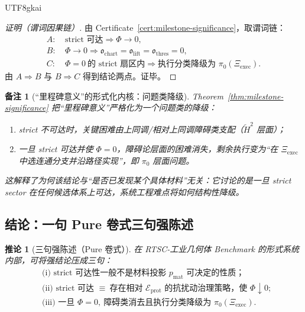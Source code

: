 \documentclass[12pt]{article}
\newtheorem{corollary}{推论}[section]
\newtheorem{remark}{备注}[section]
\newcommand{\RTSC}{\textsf{RTSC}}
\begin{document}
\begin{CJK*}{UTF8}{gkai}
\begin{proof}[证明（谓词因果链）]
由 Certificate~\ref{cert:milestone-significance}，取谓词链：
\[
\begin{aligned}
A:&\ \text{strict 可达}\Rightarrow \Phi\to 0,\\
B:&\ \Phi\to 0\Rightarrow \mathfrak{o}_{\mathrm{chart}}=\mathfrak{o}_{\mathrm{lift}}=\mathfrak{o}_{\mathrm{thres}}=0,\\
C:&\ \Phi=0\ \text{的 strict 扇区内}\Rightarrow \text{执行分类降级为 }\pi_0(\Xi_{\mathrm{exec}}).
\end{aligned}
\]
由 $A\Rightarrow B$ 与 $B\Rightarrow C$ 得到结论两点。证毕。
\end{proof}

\begin{remark}[“里程碑意义”的形式化内核：问题类降级]
Theorem~\ref{thm:milestone-significance} 把“里程碑意义”严格化为一个\emph{问题类的降级}：
\begin{enumerate}
  \item strict 不可达时，关键困难由上同调/相对上同调障碍类支配（$\check H^2$ 层面）；
  \item 一旦 strict 可达并使 $\Phi=0$，障碍论层面的困难消失，剩余执行变为“在 $\Xi_{\mathrm{exec}}$ 中选连通分支并沿路径实现”，即 $\pi_0$ 层面问题。
\end{enumerate}
这解释了为何该结论与“是否已发现某个具体材料”无关：它讨论的是一旦 strict sector 在任何候选体系上可达，系统工程难点将如何结构性降级。
\end{remark}

\subsection{结论：一句 Pure 卷式三句强陈述}

\begin{corollary}[三句强陈述（Pure 卷式）]
\label{cor:strong-conclusion}
在 \RTSC{}-工业几何体 Benchmark 的形式系统内部，可将强结论压成三句：
\[
\boxed{
\begin{aligned}
&\text{(i) strict 可达性一般不是材料投影 }p_{\mathrm{mat}}\text{ 可决定的性质；}\\
&\text{(ii) strict 可达 }\equiv\ \text{存在相对 }\mathcal{E}_{\mathrm{prot}}\text{ 的抗扰动治理策略，使 }\Phi\downarrow 0;\\
&\text{(iii) 一旦 }\Phi=0,\ \text{障碍类消去且执行分类降级为 }\pi_0(\Xi_{\mathrm{exec}}).
\end{aligned}}
\]
\end{corollary}


\end{CJK*}
\end{document}
